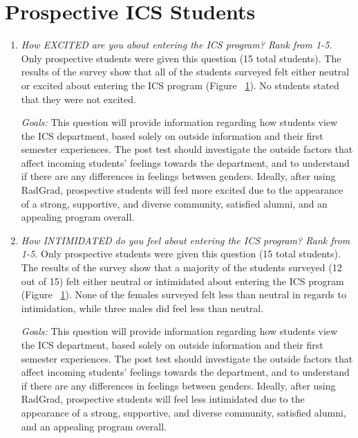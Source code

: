 \section{Prospective ICS Students}
\begin{enumerate}
\begin{figure}[h]
\centering
\texttt{[image: sr-excited-intimidated]}
\caption{Results for prospective ICS Students survey \textit{N=15}}
\label{excited-intimidated}
\end{figure}
\item\textit{How EXCITED are you about entering the ICS program? Rank from 1-5.}
Only prospective students were given this question (15 total students). The results of the survey show that all of the students surveyed felt either neutral or excited about entering the ICS program (Figure ~\ref{excited-intimidated}). No students stated that they were not excited.

\textit{Goals:} This question will provide information regarding how students view the ICS department, based solely on outside information and their first semester experiences. The post test should investigate the outside factors that affect incoming students' feelings towards the department, and to understand if there are any differences in feelings between genders. Ideally, after using RadGrad, prospective students will feel more excited due to the appearance of a strong, supportive, and diverse community, satisfied alumni, and an appealing program overall. 

\item \textit{How INTIMIDATED do you feel about entering the ICS program? Rank from 1-5.}
Only prospective students were given this question (15 total students). The results of the survey show that a majority of the students surveyed (12 out of 15) felt either neutral or intimidated about entering the ICS program (Figure ~\ref{excited-intimidated}). None of the females surveyed felt less than neutral in regards to intimidation, while three males did feel less than neutral. 

\textit{Goals:} This question will provide information regarding how students view the ICS department, based solely on outside information and their first semester experiences. The post test should investigate the outside factors that affect incoming students' feelings towards the department, and to understand if there are any differences in feelings between genders. Ideally, after using RadGrad, prospective students will feel less intimidated due to the appearance of a strong, supportive, and diverse community, satisfied alumni, and an appealing program overall.

\end{enumerate}

